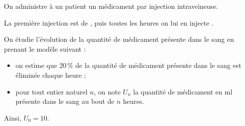 \medskip

On administre à un patient un médicament par injection intraveineuse.

La première injection est de , puis toutes les heures on lui en injecte  .

On étudie l’évolution de la quantité de médicament présente dans le sang en prenant le modèle suivant :

\begin{itemize}
\item  on estime que 20\,\% de la quantité de médicament présente dans le sang est éliminée chaque heure ;
 
 \item pour tout entier naturel $n$, on note $U_n$ la quantité de médicament en ml présente dans le sang au bout de $n$ heures.
\end{itemize}
Ainsi, $U_0=10$.
